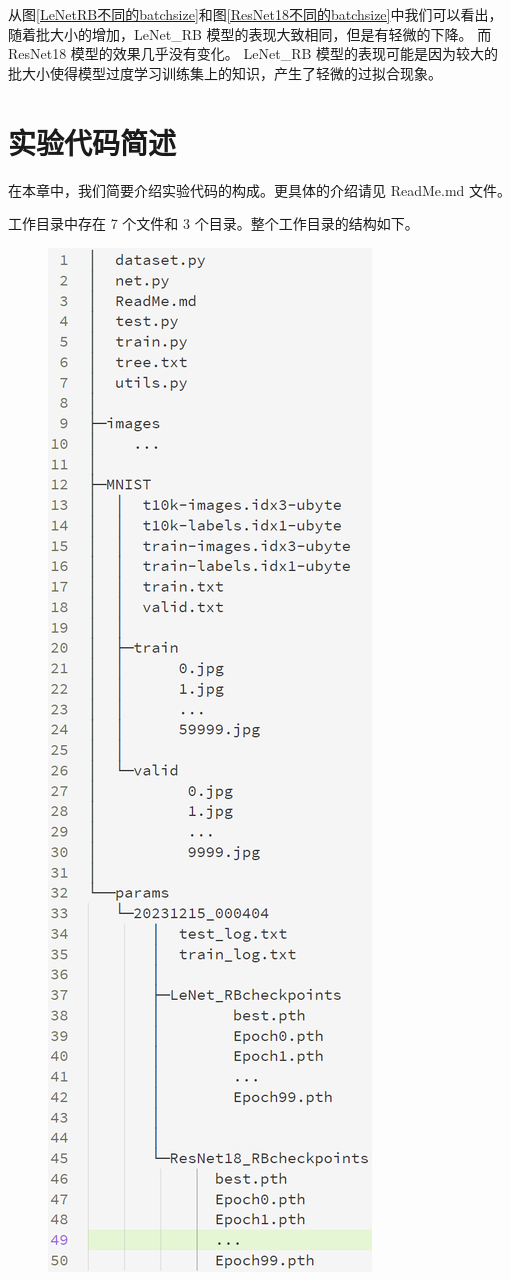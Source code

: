 \documentclass[supercite]{Experimental_Report}
\theoremstyle{definition}
\begin{document}
从图\ref{LeNetRB不同的batchsize}和图\ref{ResNet18不同的batchsize}中我们可以看出，随着批大小的增加，LeNet\_RB 模型的表现大致相同，但是有轻微的下降。
而 ResNet18 模型的效果几乎没有变化。
LeNet\_RB 模型的表现可能是因为较大的批大小使得模型过度学习训练集上的知识，产生了轻微的过拟合现象。

\section{实验代码简述}
在本章中，我们简要介绍实验代码的构成。更具体的介绍请见 ReadMe.md 文件。

工作目录中存在 7 个文件和 3 个目录。整个工作目录的结构如下。
\begin{figure}[H]
	\begin{center}
		\includegraphics[scale=0.5]{../images/tree.png}

\end{center}
\end{figure}
\end{document}

